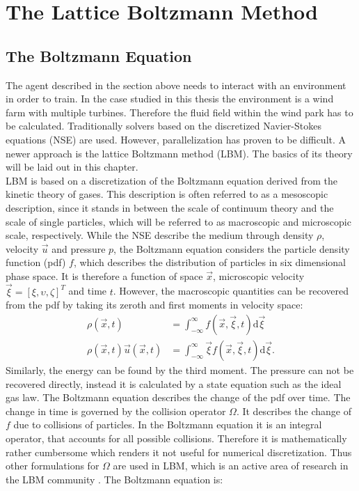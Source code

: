 \section{The Lattice Boltzmann Method}
\label{sec:LBM}
\subsection{The Boltzmann Equation}
The agent described in the section above needs to interact with an environment in order to train. In the case studied in this thesis the environment is a wind farm with multiple turbines. Therefore the fluid field within the wind park has to be calculated.
Traditionally solvers based on the discretized Navier-Stokes equations (NSE) are used. However, parallelization has proven to be difficult. A newer approach is the lattice Boltzmann method (LBM). The basics of its theory will be laid out in this chapter. \\
LBM is based on a discretization of the Boltzmann equation derived from the kinetic theory of gases. This description is often referred to as a mesoscopic description, since it stands in  between the scale of continuum theory and the scale of single particles, which will be referred to as macroscopic and microscopic scale, respectively. While the NSE describe the medium through density $\rho$, velocity $\vec{u}$ and pressure $p$, the Boltzmann equation considers the particle density function (pdf) $f$, which describes the distribution of particles in six dimensional phase space. It is therefore a function of space $\vec{x}$, microscopic velocity $\vec{\xi} = [\xi, \upsilon, \zeta]^T$ and time $t$. However, the macroscopic quantities can be recovered from the pdf by taking its zeroth and first moments in velocity space:
\begin{align}
	\rho(\vec{x}, t) &= \int_{-\infty}^{\infty} f(\vec{x}, \vec{\xi}, t) \mathrm{d}\vec{\xi} \label{eq:rho} \\
	\rho(\vec{x}, t) \vec{u}(\vec{x}, t) &= \int_{-\infty}^{\infty} \vec{\xi} f(\vec{x}, \vec{\xi}, t) \mathrm{d}\vec{\xi}. \label{eq:velocity}
\end{align}
Similarly, the energy can be found by the third moment. The pressure can not be recovered directly, instead it is calculated by a state equation such as the ideal gas law.
The Boltzmann equation describes the change of the pdf over time. The change in time is governed by the collision operator $\Omega$. It describes the change of $f$ due to collisions of particles. In the Boltzmann equation it is an integral operator, that accounts for all possible collisions. Therefore it is mathematically rather cumbersome which renders it not useful for numerical discretization. Thus other formulations for $\Omega$ are used in LBM, which is an active area of research in the LBM community \cite{coreixas_comprehensive_2019}. The Boltzmann equation is:
